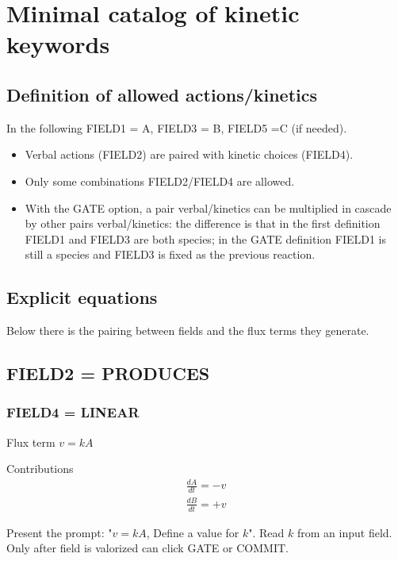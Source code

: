 \documentclass[11pt, oneside]{article}
\begin{document}
\section*{Minimal catalog of kinetic keywords}

\subsection*{Definition of allowed actions/kinetics}

In the following FIELD1 = A, FIELD3 = B, FIELD5 =C (if needed).

\begin{itemize}
\item Verbal actions (FIELD2) are paired with kinetic choices (FIELD4). 
\item Only some combinations FIELD2/FIELD4 are allowed. 
\item With the GATE option, a pair verbal/kinetics can be multiplied in cascade by other pairs verbal/kinetics: the difference is that in the first definition FIELD1 and FIELD3 are both species; in the GATE definition FIELD1 is still a species and FIELD3 is fixed as the previous reaction.
\end{itemize}


\subsection*{Explicit equations}

Below there is the pairing between fields and the flux terms they generate.

\subsection{FIELD2 = PRODUCES}

\subsubsection{FIELD4 = LINEAR}

Flux term $v = kA$ 

Contributions
\begin{align}
\frac{dA}{dt} = -v \\
\frac{dB}{dt} = +v 
\end{align}

Present the prompt: "$v = kA$, Define a value for $k$". Read $k$ from an input field.
Only after field is valorized can click GATE or COMMIT.
\end{document}
